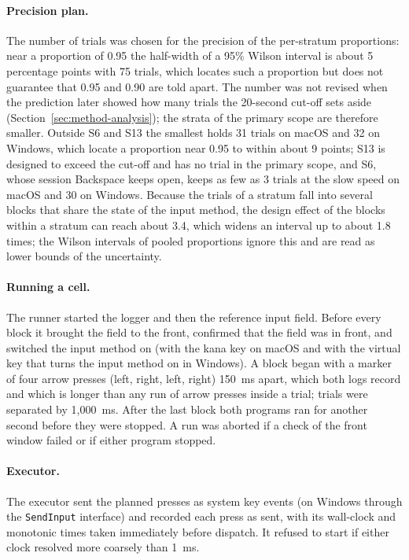 \paragraph{Precision plan.} The number of trials was chosen for the precision of the per-stratum proportions: near a
proportion of 0.95 the half-width of a 95\% Wilson interval is about 5 percentage points with 75 trials, which locates
such a proportion but does not guarantee that 0.95 and 0.90 are told apart. The number was not revised when the
prediction later showed how many trials the 20-second cut-off sets aside (Section~\ref{sec:method-analysis}); the
strata of the primary scope are therefore smaller. Outside S6 and S13 the smallest holds 31 trials on macOS and 32 on
Windows, which locate a proportion near 0.95 to within about 9 points; S13 is designed to exceed the cut-off and has
no trial in the primary scope, and S6, whose session Backspace keeps open, keeps as few as 3 trials at the slow speed
on macOS and 30 on Windows. Because the trials of a stratum fall into
several blocks that share the state of the input method, the design effect of the blocks within a stratum can reach
about 3.4, which widens an interval up to about 1.8 times; the Wilson intervals of pooled proportions ignore this and
are read as lower bounds of the uncertainty.

\paragraph{Running a cell.} The runner started the logger and then the reference input field. Before every block it
brought the field to the front, confirmed that the field was in front, and switched the input method on (with the
kana key on macOS and with the virtual key that turns the input method on in Windows). A block began with a marker of
four arrow presses (left, right, left, right) 150~ms apart, which both logs record and which is longer than any run of
arrow presses inside a trial; trials were separated by 1{,}000~ms. After the last block both programs ran for another
second before they were stopped. A run was aborted if a check of the front window failed or if either program stopped.

\paragraph{Executor.} The executor sent the planned presses as system key events (on Windows through the
\texttt{SendInput} interface) and recorded each press as sent, with its wall-clock and monotonic times taken
immediately before dispatch. It refused to start if either clock resolved more coarsely than 1~ms.

